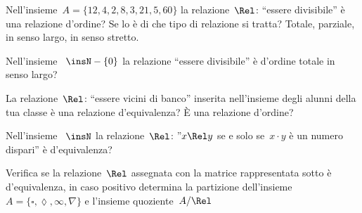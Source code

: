 \begin{esercizio}
\label{ese:B.49}
Nell'insieme~$A = \{ 12, 4, 2, 8, 3, 21, 5, 60 \}$ la relazione~$\Rel$: 
``essere divisibile'' è una relazione d'ordine? Se lo è di che tipo di 
relazione si tratta? Totale, parziale, in senso largo, in senso stretto.
\end{esercizio}

\begin{esercizio}
\label{ese:B.50}
Nell'insieme ~$\insN - \{ 0 \}$ la relazione ``essere divisibile'' è d'ordine 
totale in senso largo?
\end{esercizio}

\begin{esercizio}
\label{ese:B.53}
La relazione~$\Rel$: ``essere vicini di banco'' inserita nell'insieme degli 
alunni della tua classe è una relazione d'equivalenza? 
È una relazione d'ordine?
\end{esercizio}

\begin{esercizio}
\label{ese:B.55}
Nell'insieme ~$\insN$ la relazione~$\Rel$: 
''$x \Rel y$ se e solo se~$x \cdot y$ è un numero dispari'' è d'equivalenza?
\end{esercizio}

\begin{esercizio}
\label{ese:B.57}
Verifica se la relazione~$\Rel$ assegnata con la matrice rappresentata
sotto è d'equivalenza, in caso positivo determina la partizione 
dell'insieme~$A =\{\square, \lozenge, \infty, \nabla\}$ e l'insieme
quoziente~$A/\Rel$
\end{esercizio}

